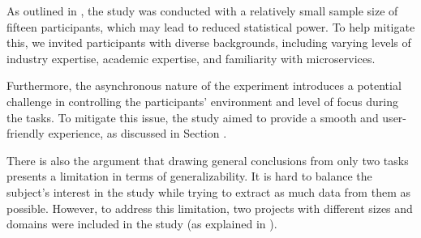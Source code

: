 As outlined in , the study was conducted with a relatively
small sample size of fifteen participants, which may lead to reduced
statistical power. To help mitigate this, we invited participants with diverse
backgrounds, including varying levels of industry expertise, academic
expertise, and familiarity with microservices.

Furthermore, the asynchronous nature of the experiment introduces a potential
challenge in controlling the participants' environment and level of focus
during the tasks. To mitigate this issue, the study aimed to provide a smooth
and user-friendly experience, as discussed in Section .

There is also the argument that drawing general conclusions from only two tasks
presents a limitation in terms of generalizability. It is hard to balance the
subject's interest in the study while trying to extract as much data from them
as possible. However, to address this limitation, two projects with different
sizes and domains were included in the study (as explained in
).
